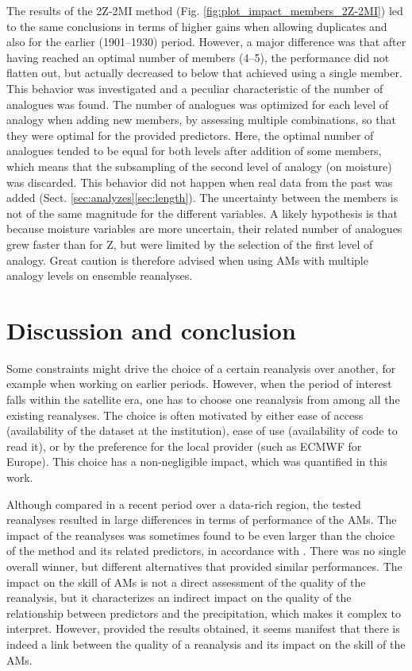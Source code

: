 \documentclass[smallextended]{svjour3}       %
\begin{document}
	The results of the 2Z-2MI method (Fig. \ref{fig:plot_impact_members_2Z-2MI}) led to the same conclusions in terms of higher gains when allowing duplicates and also for the earlier (1901--1930) period. However, a major difference was that after having reached an optimal number of members (4--5), the performance did not flatten out, but actually decreased to below that achieved using a single member. This behavior was investigated and a peculiar characteristic of the number of analogues was found. The number of analogues was optimized for each level of analogy when adding new members, by assessing multiple combinations, so that they were optimal for the provided predictors. Here, the optimal number of analogues tended to be equal for both levels after addition of some members, which means that the subsampling of the second level of analogy (on moisture) was discarded. This behavior did not happen when real data from the past was added (Sect. \ref{sec:analyzes}\ref{sec:length}). The uncertainty between the members is not of the same magnitude for the different variables. A likely hypothesis is that because moisture variables are more uncertain, their related number of analogues grew faster than for Z, but were limited by the selection of the first level of analogy. Great caution is therefore advised when using AMs with multiple analogy levels on ensemble reanalyses.
	
	
	\section{Discussion and conclusion}
	\label{sec:discussion-conclusion}
	
	Some constraints might drive the choice of a certain reanalysis over another, for example when working on earlier periods. However, when the period of interest falls within the satellite era, one has to choose one reanalysis from among all the existing reanalyses. The choice is often motivated by either ease of access (availability of the dataset at the institution), ease of use (availability of code to read it), or by the preference for the local provider (such as ECMWF for Europe). This choice has a non-negligible impact, which was quantified in this work.
	
	Although compared in a recent period over a data-rich region, the tested reanalyses resulted in large differences in terms of performance of the AMs. The impact of the reanalyses was sometimes found to be even larger than the choice of the method and its related predictors, in accordance with \citet{Dayon2015}. There was no single overall winner, but different alternatives that provided similar performances. The impact on the skill of AMs is not a direct assessment of the quality of the reanalysis, but it characterizes an indirect impact on the quality of the relationship between predictors and the precipitation, which makes it complex to interpret. However, provided the results obtained, it seems manifest that there is indeed a link between the quality of a reanalysis and its impact on the skill of the AMs.
	
\end{document}
